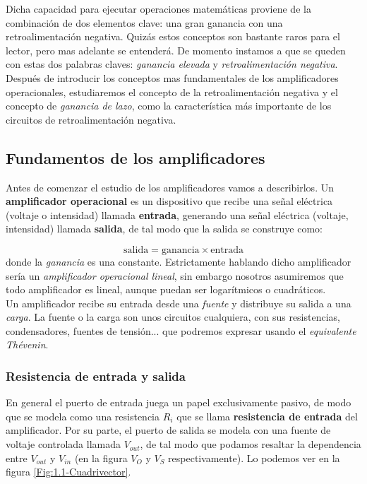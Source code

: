 \documentclass[12pt,a4paper]{article}
\numberwithin{equation}{section}
\numberwithin{figure}{section}
\begin{document}
Dicha capacidad para ejecutar operaciones matemáticas proviene de la combinación de dos elementos clave: una gran ganancia con una retroalimentación negativa. Quizás estos conceptos son bastante raros para el lector, pero mas adelante se entenderá. De momento instamos a que se queden con estas dos palabras claves: \textit{ganancia elevada} y \textit{retroalimentación negativa}. \\

Después de introducir los conceptos mas fundamentales de los amplificadores operacionales, estudiaremos el concepto de la retroalimentación negativa y el concepto de \textit{ganancia de lazo}, como la característica más importante de los circuitos de retroalimentación negativa.   

\subsection{Fundamentos de los amplificadores}

Antes de comenzar el estudio de los amplificadores vamos a describirlos. Un \textbf{amplificador operacional} es un dispositivo que recibe una señal eléctrica (voltaje o intensidad) llamada \textbf{entrada}, generando una señal eléctrica (voltaje, intensidad) llamada \textbf{salida}, de tal modo que la salida se construye como:

\begin{equation}
\mathrm{salida} = \mathrm{ganancia}  \times \mathrm{entrada}
\end{equation}
donde la \textit{ganancia} es una constante. Estrictamente hablando dicho amplificador sería un \textit{amplificador operacional lineal}, sin embargo nosotros asumiremos que todo amplificador es lineal, aunque puedan ser logarítmicos o cuadráticos. \\

Un amplificador recibe su entrada desde una \textit{fuente} y distribuye su salida a una \textit{carga}. La fuente o la carga son unos circuitos cualquiera, con sus resistencias, condensadores, fuentes de tensión... que podremos expresar usando el \textit{equivalente Thévenin}.  \\


\subsubsection{Resistencia de entrada y salida}

En general el puerto de entrada juega un papel exclusivamente pasivo, de modo que se modela como una resistencia $R_i$ que se llama \textbf{resistencia de entrada} del amplificador. Por su parte, el puerto de salida se modela con una fuente de voltaje controlada llamada $V_{out}$, de tal modo que podamos resaltar la dependencia entre $V_{out}$ y $V_{in}$ (en la figura $V_O$ y $V_S$ respectivamente). Lo podemos ver en la figura \ref{Fig:1.1-Cuadrivector}. \\
\end{document}

